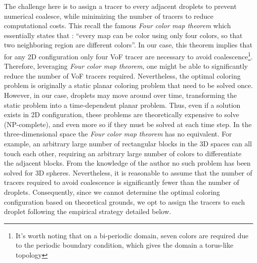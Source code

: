 The challenge here is to assign a tracer to every adjacent droplets to prevent numerical coalesce, while minimizing the number of tracers to reduce computational costs. 
This recall the famous \textit{Four color map theorem} \citep{appel1977solution} which essentially states that : 
\enquote{every map can be color using only four colors, so that two neighboring region are different colors}. 
In our case, this theorem implies that for any 2D configuration only four VoF tracer are necessary to avoid coalescence\footnote{It's worth noting that on a bi-periodic domain, seven colors are required due to the periodic boundary condition, which gives the domain a torus-like topology  }. 
Therefore, leveraging \textit{Four color map theorem}, one might be able to significantly reduce the number of VoF tracers required.
Nevertheless, the optimal coloring problem is originally a static planar coloring problem that need to be solved once. 
However, in our case, droplets may move around over time, transforming the static problem into a time-dependent planar problem. 
Thus, even if a solution exists in 2D configuration, these problems are theoretically expensive to solve (NP-complete), and even more so if they must be solved at each time step.  
In the three-dimensional space the \textit{Four color map theorem} has no equivalent. 
For example, an arbitrary large number of rectangular blocks in the 3D spaces can all touch each other, requiring an arbitrary large number of colors to differentiate the adjacent blocks\citep{magnant2011coloring}. 
From the knowledge of the author no such problem has been solved for 3D spheres. 
Nevertheless, it is reasonable to assume that the number of tracers required to avoid coalescence is significantly fewer than the number of droplets.
Consequently, since we cannot determine the optimal coloring configuration based on theoretical grounds, we opt to assign the tracers to each droplet following the empirical strategy detailed below.

